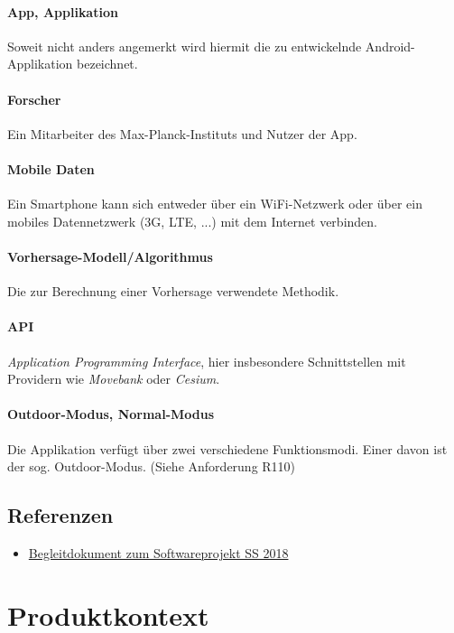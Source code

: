 \documentclass[12pt]{article} %
\begin{document}
\paragraph{App, Applikation} Soweit nicht anders angemerkt wird hiermit die zu entwickelnde Android-Applikation bezeichnet.
 \paragraph{Forscher} Ein Mitarbeiter des Max-Planck-Instituts und Nutzer der App.
 \paragraph{Mobile Daten} Ein Smartphone kann sich entweder über ein WiFi-Netzwerk oder über ein mobiles Datennetzwerk (3G, LTE, ...) mit dem Internet verbinden. 
\paragraph{Vorhersage-Modell/Algorithmus} Die zur Berechnung einer Vorhersage verwendete Methodik. 
\paragraph{API} \textit{Application Programming Interface}, hier insbesondere Schnittstellen mit Providern wie \textit{Movebank} oder \textit{Cesium}. 
\paragraph{Outdoor-Modus, Normal-Modus} Die Applikation verfügt über zwei verschiedene Funktionsmodi. Einer davon ist der sog. Outdoor-Modus. (Siehe Anforderung R110)

\subsection{Referenzen}

\begin{itemize} 
 	 \item  \href{https://docs.google.com/document/d/1Yc2f18JFaHyhrgM2h2WiATQ0zVmZnsc9W1ImhwWJF-g/edit?usp=sharing}{Begleitdokument zum Softwareprojekt SS 2018}
\end{itemize} 




\newpage
\section{Produktkontext} \label{kontext}
\end{document}
